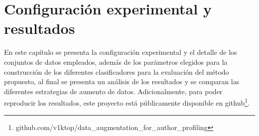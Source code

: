 \chapter{Configuración experimental y resultados}
En este capítulo se presenta la configuración experimental y el detalle de los conjuntos de datos empleados, además de los parámetros elegidos para la construcción de los diferentes clasificadores para la evaluación del método propuesto, al final se presenta un análisis de los resultados y se comparan las diferentes estrategias de aumento de datos. Adicionalmente, para poder reproducir los resultados, este proyecto está públicamente disponible en github\footnote{github.com/v1ktop/data\_augmentation\_for\_author\_profiling}.







